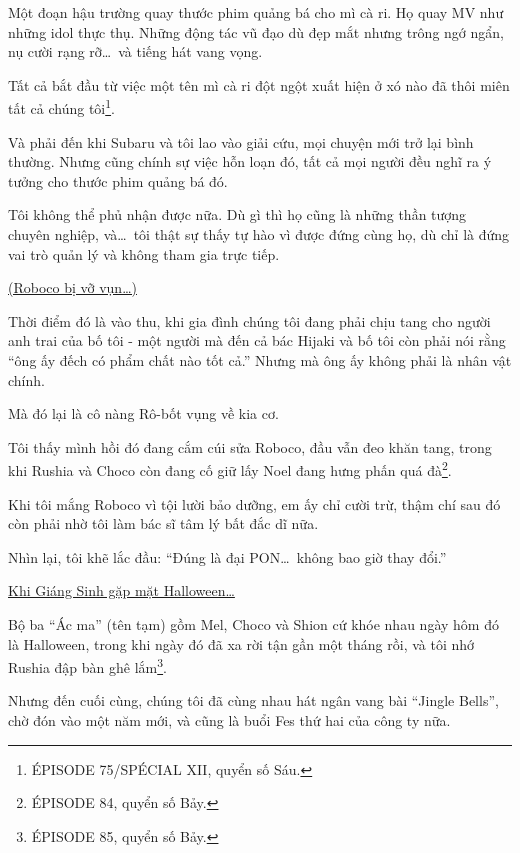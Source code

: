 \documentclass[../main.tex]{subfiles}
\begin{document}
Một đoạn hậu trường quay thước phim quảng bá cho mì cà ri. Họ quay MV như những idol thực thụ. Những động tác vũ đạo dù đẹp mắt nhưng trông ngớ ngẩn, nụ cười rạng rỡ\dots\ và tiếng hát vang vọng.

Tất cả bắt đầu từ việc một tên mì cà ri đột ngột xuất hiện ở xó nào đã thôi miên tất cả chúng tôi\footnote{{\flaregothic ÉPISODE 75/SPÉCIAL {\ab XII}}, quyển số Sáu.}.

Và phải đến khi Subaru và tôi lao vào giải cứu, mọi chuyện mới trở lại bình thường. Nhưng cũng chính sự việc hỗn loạn đó, tất cả mọi người đều nghĩ ra ý tưởng cho thước phim quảng bá đó.

Tôi không thể phủ nhận được nữa. Dù gì thì họ cũng là những thần tượng chuyên nghiệp, và\dots\ tôi thật sự thấy tự hào vì được đứng cùng họ, dù chỉ là đứng vai trò quản lý và không tham gia trực tiếp.

\begin{center}
    \uline{(Roboco bị vỡ vụn\dots)}
\end{center}

Thời điểm đó là vào thu, khi gia đình chúng tôi đang phải chịu tang cho người anh trai của bố tôi - một người mà đến cả bác Hijaki và bố tôi còn phải nói rằng ``ông ấy đếch có phẩm chất nào tốt cả.'' Nhưng mà ông ấy không phải là nhân vật chính.

Mà đó lại là cô nàng Rô-bốt vụng về kia cơ.

Tôi thấy mình hồi đó đang cắm cúi sửa Roboco, đầu vẫn đeo khăn tang, trong khi Rushia và Choco còn đang cố giữ lấy Noel đang hưng phấn quá đà\footnote{{\flaregothic ÉPISODE 84}, quyển số Bảy.}.

Khi tôi mắng Roboco vì tội lười bảo dưỡng, em ấy chỉ cười trừ, thậm chí sau đó còn phải nhờ tôi làm bác sĩ tâm lý bất đắc dĩ nữa.

Nhìn lại, tôi khẽ lắc đầu: ``Đúng là đại PON\dots\ không bao giờ thay đổi.''

\begin{center}
    \uline{Khi Giáng Sinh gặp mặt Halloween\dots}
\end{center}

Bộ ba ``Ác ma'' (tên tạm) gồm Mel, Choco và Shion cứ khóe nhau ngày hôm đó là Halloween, trong khi ngày đó đã xa rời tận gần một tháng rồi, và tôi nhớ Rushia đập bàn ghê lắm\footnote{{\flaregothic ÉPISODE 85}, quyển số Bảy.}.

Nhưng đến cuối cùng, chúng tôi đã cùng nhau hát ngân vang bài ``Jingle Bells'', chờ đón vào một năm mới, và cũng là buổi Fes thứ hai của công ty nữa.
\end{document}
